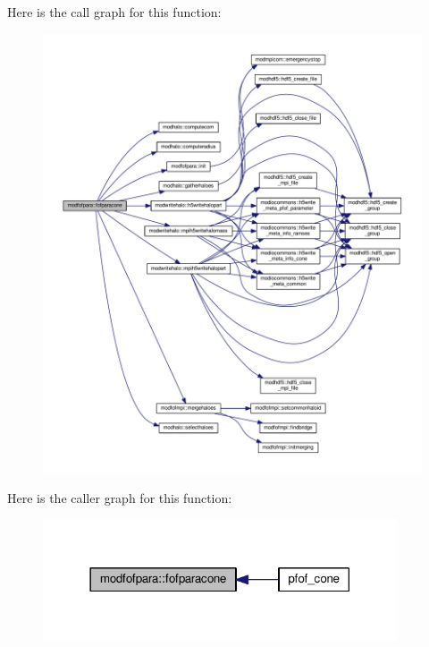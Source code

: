 Here is the call graph for this function\+:\nopagebreak
\begin{figure}[H]
\begin{center}
\leavevmode
\includegraphics[width=350pt]{namespacemodfofpara_a033a2820dd29f107782b566ca298bde4_cgraph}
\end{center}
\end{figure}




Here is the caller graph for this function\+:\nopagebreak
\begin{figure}[H]
\begin{center}
\leavevmode
\includegraphics[width=297pt]{namespacemodfofpara_a033a2820dd29f107782b566ca298bde4_icgraph}
\end{center}
\end{figure}



